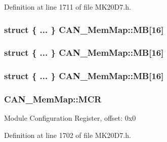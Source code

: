Definition at line 1711 of file M\+K20\+D7.\+h.

\subsubsection[{\texorpdfstring{MB}{MB}}]{\setlength{\rightskip}{0pt plus 5cm}struct \{ ... \}   C\+A\+N\+\_\+\+Mem\+Map\+::\+MB\mbox{[}16\mbox{]}}\hypertarget{struct_c_a_n___mem_map_aee2dee7957731f09f436554f334f3041}{}\label{struct_c_a_n___mem_map_aee2dee7957731f09f436554f334f3041}
\subsubsection[{\texorpdfstring{MB}{MB}}]{\setlength{\rightskip}{0pt plus 5cm}struct \{ ... \}   C\+A\+N\+\_\+\+Mem\+Map\+::\+MB\mbox{[}16\mbox{]}}\hypertarget{struct_c_a_n___mem_map_a5b43fb77dbd3f43b95004ef5b48ef4ea}{}\label{struct_c_a_n___mem_map_a5b43fb77dbd3f43b95004ef5b48ef4ea}
\subsubsection[{\texorpdfstring{MB}{MB}}]{\setlength{\rightskip}{0pt plus 5cm}struct \{ ... \}   C\+A\+N\+\_\+\+Mem\+Map\+::\+MB\mbox{[}16\mbox{]}}\hypertarget{struct_c_a_n___mem_map_ae0b2fe9e8228155099ffb970b67db8a9}{}\label{struct_c_a_n___mem_map_ae0b2fe9e8228155099ffb970b67db8a9}
\subsubsection[{\texorpdfstring{M\+CR}{MCR}}]{ C\+A\+N\+\_\+\+Mem\+Map\+::\+M\+CR}\hypertarget{struct_c_a_n___mem_map_aa78ee3ab61a8a0a9bceade6152bccec3}{}\label{struct_c_a_n___mem_map_aa78ee3ab61a8a0a9bceade6152bccec3}
Module Configuration Register, offset\+: 0x0 

Definition at line 1702 of file M\+K20\+D7.\+h.

